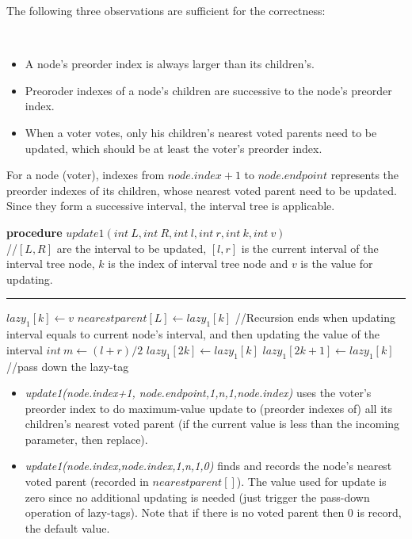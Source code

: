 The following three observations are sufficient for the correctness:
\begin{observation}
\
	\begin{itemize}
	    \item A node's preorder index is always larger than its children's.
	    \item Preoroder indexes of a node's children are successive to the node's preorder index. 
	    \item When a voter votes, only his children's nearest voted parents need to be updated, which should be at least the voter's preorder index.
	\end{itemize}
\end{observation}
For a node (voter), indexes from $node.index+1$ to $node.endpoint$ represents the preorder indexes of its children, whose nearest voted parent need to be updated. Since they form a successive interval, the interval tree is applicable. 
\begin{algorithm}
	\textbf{procedure} $update1(int~L,int ~R, int~l, int~r, int~k, int~v)${\color{gray}
		\\//$[L,R]$ are the interval to be updated, $[l,r]$ is the current interval of the interval tree node, $k$ is the index of  interval tree node and $v$ is the value for updating.}
	\hrule
	{
		 {$lazy_1[k] \leftarrow v$}
		 {$nearestparent[L] \leftarrow lazy_1[k]$}
		{\color{gray}
			//Recursion ends when updating interval equals to current node's interval, and then updating the value of the interval}
	}
	{
		$int~m \leftarrow (l+r)/2$\;
		 {$lazy_1[2k] \leftarrow lazy_1[k]$}
		 {$lazy_1[2k+1] \leftarrow lazy_1[k]${\color{gray}
				//pass down the lazy-tag}}
	}
\end{algorithm}

\begin{itemize}
	\item {\em update1(node.index+1, node.endpoint,1,n,1,node.index)} uses the voter's preorder index to do maximum-value update to (preorder indexes of) all its children's nearest voted parent (if the current value is less than the incoming parameter, then replace). 
	\item {\em update1(node.index,node.index,1,n,1,0)} finds and records the node's nearest voted parent (recorded in $nearestparent[]$). The value used for update is zero since no additional updating is needed (just trigger the pass-down operation of lazy-tags). Note that if there is no voted parent then 0 is record, the default value. 
\end{itemize}

